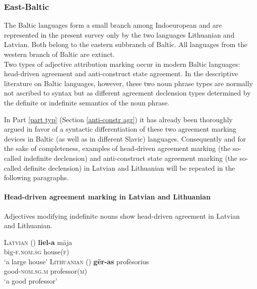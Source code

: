 \subsubsection{East-Baltic}
The Baltic languages form a small branch among Indoeuropean and are represented in the present survey only by the two languages Lithuanian and Latvian. Both belong to the eastern subbranch of Baltic. All languages from the western branch of Baltic are extinct.\\

\noindent Two types of adjective attribution marking occur in modern Baltic languages: head-driven agreement and anti-construct state agreement. In the descriptive literature on Baltic languages, however, these two noun phrase types are normally not ascribed to syntax but as different agreement declension types determined by the definite or indefinite semantics of the noun phrase.

In Part \ref{part typ} (Section \ref{anti-constr agr}) it has already been thoroughly argued in favor of a syntactic differentiation of these two agreement marking devices in Baltic (as well as in different Slavic) languages. Consequently and for the sake of completeness, examples of head-driven agreement marking (the so-called indefinite declension) and anti-construct state agreement marking (the so-called definite declension) in Latvian and Lithuanian will be repeated in the following paragraphs.

\paragraph{Head-driven agreement marking in Latvian and Lithuanian} 
Adjectives modifying indefinite nouns show head-driven agreement in Latvian and Lithuanian.

\begin{exe}
\ex 
\begin{xlist}
\ex	\textsc{Latvian} (\citealt[115]{dahl2007})
\gll 	\textbf{liel-a} māja\\
	big-\textsc{f.nom.sg} house(\textsc{f})\\
\glt	‘a large house’
\ex \textsc{Lithuanian} (\citealt[13]{bechert1993})
\gll 	\textbf{gēr-as}			profèsorius\\
	good-\textsc{nom.sg.m} professor(\textsc{m})\\
\glt	‘a good professor’
\end{xlist}
\end{exe}
